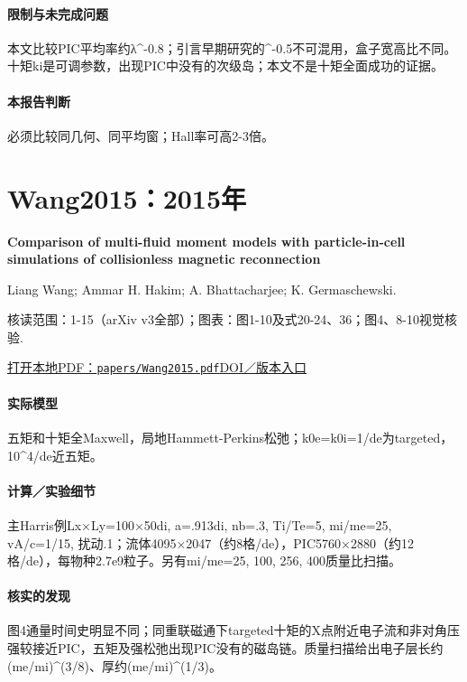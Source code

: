 \paragraph{限制与未完成问题}本文比较PIC平均率约λ\textasciicircum{}-0.8；引言早期研究的\textasciicircum{}-0.5不可混用，盒子宽高比不同。十矩ki是可调参数，出现PIC中没有的次级岛；本文不是十矩全面成功的证据。

\paragraph{本报告判断}必须比较同几何、同平均窗；Hall率可高2-3倍。

\section{Wang2015：2015年}\label{paper:Wang2015}

\textbf{Comparison of multi-fluid moment models with particle-in-cell simulations of collisionless magnetic reconnection}\citep{Wang2015}\

Liang Wang;  Ammar H. Hakim;  A. Bhattacharjee;  K. Germaschewski.

\textsf{核读范围：}1-15（arXiv v3全部）；\textsf{图表：}图1-10及式20-24、36；图4、8-10视觉核验.

\href{run:papers/Wang2015.pdf}{打开本地PDF：\texttt{papers/Wang2015.pdf}}\quad\href{https://doi.org/10.1063/1.4906063}{DOI／版本入口}

\paragraph{实际模型}五矩和十矩全Maxwell，局地Hammett-Perkins松弛；k0e=k0i=1/de为targeted，10\textasciicircum{}4/de近五矩。

\paragraph{计算／实验细节}主Harris例Lx×Ly=100×50di, a=.913di, nb=.3, Ti/Te=5, mi/me=25, vA/c=1/15, 扰动.1；流体4095×2047（约8格/de），PIC5760×2880（约12格/de），每物种2.7e9粒子。另有mi/me=25, 100, 256, 400质量比扫描。

\paragraph{核实的发现}图4通量时间史明显不同；同重联磁通下targeted十矩的X点附近电子流和非对角压强较接近PIC，五矩及强松弛出现PIC没有的磁岛链。质量扫描给出电子层长约(me/mi)\textasciicircum{}(3/8)、厚约(me/mi)\textasciicircum{}(1/3)。

